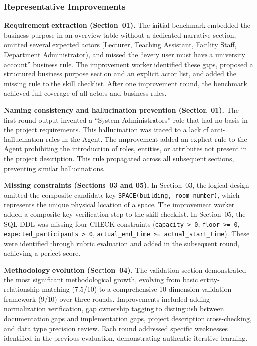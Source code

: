 \subsubsection{Representative Improvements}

\textbf{Requirement extraction (Section~01).} The initial benchmark embedded the business purpose in an overview table without a dedicated narrative section, omitted several expected actors (Lecturer, Teaching Assistant, Facility Staff, Department Administrator), and missed the ``every user must have a university account'' business rule. The improvement worker identified these gaps, proposed a structured business purpose section and an explicit actor list, and added the missing rule to the skill checklist. After one improvement round, the benchmark achieved full coverage of all actors and business rules.

\textbf{Naming consistency and hallucination prevention (Section~01).} The first-round output invented a ``System Administrators'' role that had no basis in the project requirements. This hallucination was traced to a lack of anti-hallucination rules in the Agent. The improvement added an explicit rule to the Agent prohibiting the introduction of roles, entities, or attributes not present in the project description. This rule propagated across all subsequent sections, preventing similar hallucinations.

\textbf{Missing constraints (Sections~03 and 05).} In Section~03, the logical design omitted the composite candidate key \texttt{SPACE(building, room\_number)}, which represents the unique physical location of a space. The improvement worker added a composite key verification step to the skill checklist. In Section~05, the SQL DDL was missing four CHECK constraints (\texttt{capacity > 0}, \texttt{floor >= 0}, \texttt{expected\_participants > 0}, \texttt{actual\_end\_time >= actual\_start\_time}). These were identified through rubric evaluation and added in the subsequent round, achieving a perfect score.

\textbf{Methodology evolution (Section~04).} The validation section demonstrated the most significant methodological growth, evolving from basic entity-relationship matching (7.5/10) to a comprehensive 10-dimension validation framework (9/10) over three rounds. Improvements included adding normalization verification, gap ownership tagging to distinguish between documentation gaps and implementation gaps, project description cross-checking, and data type precision review. Each round addressed specific weaknesses identified in the previous evaluation, demonstrating authentic iterative learning.

